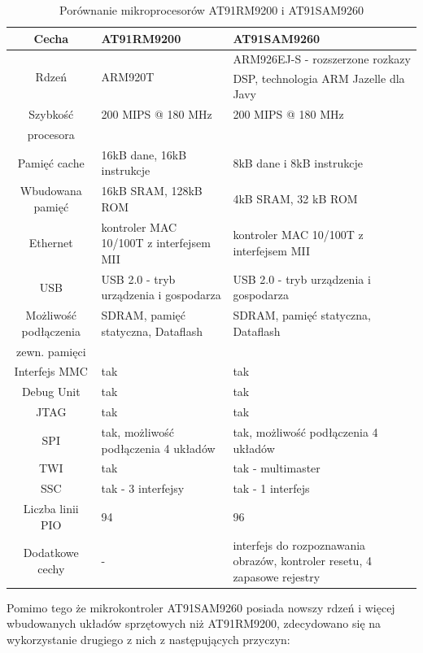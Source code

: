 \documentclass[a4paper,12pt]{book}
\begin{document}
				\begin{table}[]
					\begin{tabularx}{\textwidth }{|c|X|X|}
						\hline \textbf{Cecha} &\textbf{AT91RM9200} & \textbf{AT91SAM9260} \\ 
						\hline Rdzeń & ARM920T & ARM926EJ-S - rozszerzone rozkazy DSP, technologia ARM Jazelle\textsuperscript{\textregistered} dla Javy \\
						\hline Szybkość & 200 MIPS @ 180 MHz & 200 MIPS @ 180 MHz \\
							procesora & & \\
						\hline Pamięć cache & 16kB dane, 16kB instrukcje & 8kB dane i 8kB instrukcje \\
						\hline Wbudowana pamięć & 16kB SRAM, 128kB ROM & 4kB SRAM, 32 kB ROM \\
						\hline Ethernet & kontroler MAC 10/100T z interfejsem MII & kontroler MAC 10/100T z interfejsem MII \\
						\hline USB & USB 2.0 - tryb urządzenia i gospodarza & USB 2.0 - tryb urządzenia i gospodarza \\
						\hline Możliwość podłączenia & SDRAM, pamięć statyczna, Dataflash & SDRAM, pamięć statyczna, Dataflash \\
							zewn. pamięci & & \\
						\hline Interfejs MMC & tak & tak \\
						\hline Debug Unit & tak & tak \\
						\hline JTAG & tak & tak \\
						\hline SPI & tak, możliwość podłączenia 4 układów & tak, możliwość podłączenia 4 układów \\
						\hline TWI & tak & tak - multimaster \\
						\hline SSC & tak - 3 interfejsy & tak - 1 interfejs \\
						\hline Liczba linii PIO & 94 & 96 \\
						\hline Dodatkowe cechy & - & interfejs do rozpoznawania obrazów, kontroler resetu, 4 zapasowe rejestry\\
						\hline 
					\end{tabularx}
					\caption{Porównanie mikroprocesorów AT91RM9200 i AT91SAM9260}
					\label{tab:arm_comparison}
				\end{table}
			Pomimo tego że mikrokontroler AT91SAM9260 posiada nowszy rdzeń i więcej wbudowanych układów sprzętowych niż AT91RM9200, zdecydowano się na wykorzystanie drugiego z nich z następujących przyczyn:
\end{document}
